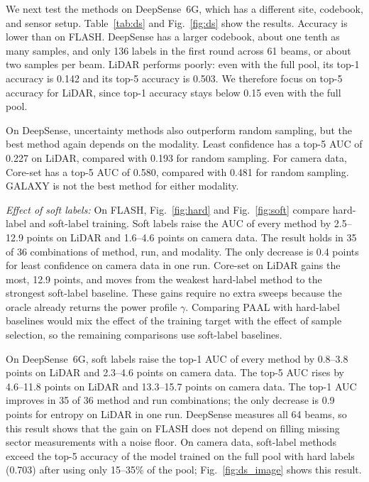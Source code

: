 \documentclass[journal,onecolumn]{IEEEtran}
\begin{document}
We next test the methods on DeepSense~6G, which has a different site, codebook, and sensor setup. Table~\ref{tab:ds} and Fig.~\ref{fig:ds} show the results. Accuracy is lower than on FLASH. DeepSense has a larger codebook, about one tenth as many samples, and only 136 labels in the first round across 61 beams, or about two samples per beam. LiDAR performs poorly: even with the full pool, its top-1 accuracy is 0.142 and its top-5 accuracy is 0.503. We therefore focus on top-5 accuracy for LiDAR, since top-1 accuracy stays below 0.15 even with the full pool.

On DeepSense, uncertainty methods also outperform random sampling, but the best method again depends on the modality. Least confidence has a top-5 AUC of 0.227 on LiDAR, compared with 0.193 for random sampling. For camera data, Core-set has a top-5 AUC of 0.580, compared with 0.481 for random sampling. GALAXY is not the best method for either modality.

\emph{Effect of soft labels:} On FLASH, Fig.~\ref{fig:hard} and Fig.~\ref{fig:soft} compare hard-label and soft-label training. Soft labels raise the AUC of every method by 2.5--12.9 points on LiDAR and 1.6--4.6 points on camera data. The result holds in 35 of 36 combinations of method, run, and modality. The only decrease is 0.4 points for least confidence on camera data in one run. Core-set on LiDAR gains the most, 12.9 points, and moves from the weakest hard-label method to the strongest soft-label baseline. These gains require no extra sweeps because the oracle already returns the power profile $\gamma$. Comparing PAAL with hard-label baselines would mix the effect of the training target with the effect of sample selection, so the remaining comparisons use soft-label baselines.

On DeepSense~6G, soft labels raise the top-1 AUC of every method by 0.8--3.8 points on LiDAR and 2.3--4.6 points on camera data. The top-5 AUC rises by 4.6--11.8 points on LiDAR and 13.3--15.7 points on camera data. The top-1 AUC improves in 35 of 36 method and run combinations; the only decrease is 0.9 points for entropy on LiDAR in one run. DeepSense measures all 64 beams, so this result shows that the gain on FLASH does not depend on filling missing sector measurements with a noise floor. On camera data, soft-label methods exceed the top-5 accuracy of the model trained on the full pool with hard labels (0.703) after using only 15--35\% of the pool; Fig.~\ref{fig:ds_image} shows this result.
\end{document}
